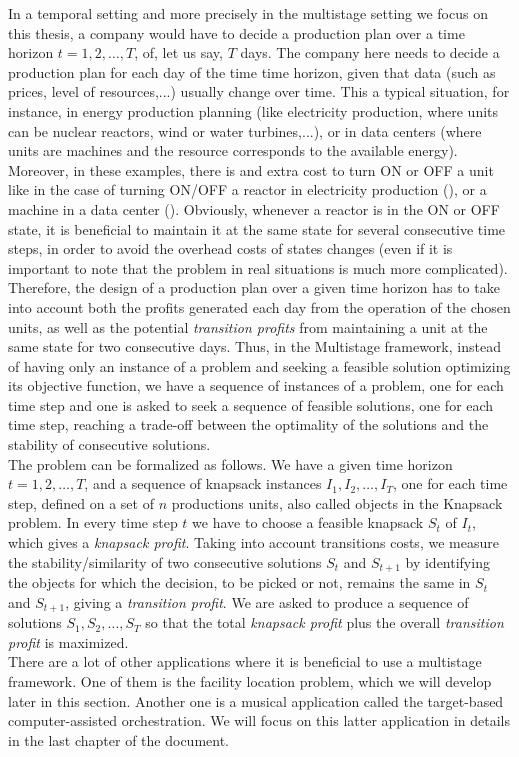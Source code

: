 \documentclass[a4paper]{book}
\begin{document}
In a temporal setting and more precisely in the multistage setting we focus on this thesis, a company would have to decide a production plan over a time horizon $t=1,2,\ldots, T$, of, let us say, $T$ days. The company here needs to decide a production plan for each day of the time time horizon, given that data (such as prices, level of resources,...) usually change over time. This a typical situation, for instance, in energy production planning (like electricity production, where units can be nuclear reactors, wind or water turbines,...), or in data centers (where units are machines and the resource corresponds to the available energy). Moreover, in these examples, there is and extra cost to turn ON or OFF a unit like in the case of turning ON/OFF a reactor in electricity production (\cite{rottner2018combinatorial}), or a machine in a data center (\cite{DBLP:conf/spaa/2017}). Obviously, whenever a reactor is in the ON or OFF state, it is beneficial to maintain it at the same state for several consecutive time steps, in order to avoid the overhead costs of states changes (even if it is important to note that the problem in real situations is much more complicated). Therefore, the design of a production plan over a given time horizon has to take into account both the profits generated each day from the operation of the chosen units, as well as the potential \textit{transition profits} from maintaining a unit at the same state for two consecutive days. Thus, in the {\sc Multistage} framework, instead of having only an instance of a problem and seeking a feasible solution optimizing its objective function, we have a sequence of instances of a problem, one for each time step and one is asked to seek a sequence of feasible solutions, one for each time step, reaching a trade-off between the optimality of the solutions and the stability of consecutive solutions.\\
The problem can be formalized as follows. We have a given time horizon $t=1,2,\ldots,T$, and a sequence of knapsack instances $I_1, I_2, \ldots,I_T$, one for each time step, defined on a set of $n$ productions units, also called objects in the {\sc Knapsack} problem. In every time step $t$ we have to choose a feasible knapsack $S_t$ of $I_t$, which gives a \textit{knapsack profit}. Taking into account transitions costs, we measure the stability/similarity of two consecutive solutions $S_t$ and $S_{t+1}$ by identifying the objects for which the decision, to be picked or not, remains the same in $S_t$ and $S_{t+1}$, giving a \textit{transition profit}. We are asked to produce a sequence of solutions $S_1, S_2, \ldots, S_T$ so that the total \textit{knapsack profit} plus the overall \textit{transition profit} is maximized.\\
There are a lot of other applications where it is beneficial to use a multistage framework. One of them is the {\sc facility location} problem, which we will develop later in this section. Another one is a musical application called the target-based computer-assisted orchestration. We will focus on this latter application in details in the last chapter of the document.\\
\end{document}
